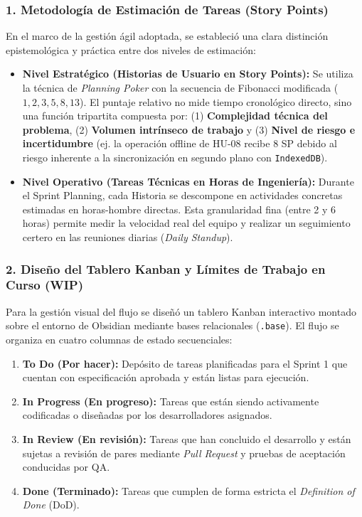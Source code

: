 \subsubsection*{\color{mauve} 1. Metodología de Estimación de Tareas (Story Points)}
\noindent En el marco de la gestión ágil adoptada, se estableció una clara distinción epistemológica y práctica entre dos niveles de estimación:
\begin{itemize}
    \item \textbf{Nivel Estratégico (Historias de Usuario en Story Points):} Se utiliza la técnica de \textit{Planning Poker} con la secuencia de Fibonacci modificada ($1, 2, 3, 5, 8, 13$). El puntaje relativo no mide tiempo cronológico directo, sino una función tripartita compuesta por: (1) \textbf{Complejidad técnica del problema}, (2) \textbf{Volumen intrínseco de trabajo} y (3) \textbf{Nivel de riesgo e incertidumbre} (ej. la operación offline de HU-08 recibe 8 SP debido al riesgo inherente a la sincronización en segundo plano con \texttt{IndexedDB}).
    \item \textbf{Nivel Operativo (Tareas Técnicas en Horas de Ingeniería):} Durante el Sprint Planning, cada Historia se descompone en actividades concretas estimadas en horas-hombre directas. Esta granularidad fina (entre 2 y 6 horas) permite medir la velocidad real del equipo y realizar un seguimiento certero en las reuniones diarias (\textit{Daily Standup}).
\end{itemize}

\subsubsection*{\color{mauve} 2. Diseño del Tablero Kanban y Límites de Trabajo en Curso (WIP)}
\noindent Para la gestión visual del flujo se diseñó un tablero Kanban interactivo montado sobre el entorno de Obsidian mediante bases relacionales (\texttt{.base}). El flujo se organiza en cuatro columnas de estado secuenciales:
\begin{enumerate}
    \item \textbf{To Do (Por hacer):} Depósito de tareas planificadas para el Sprint 1 que cuentan con especificación aprobada y están listas para ejecución.
    \item \textbf{In Progress (En progreso):} Tareas que están siendo activamente codificadas o diseñadas por los desarrolladores asignados.
    \item \textbf{In Review (En revisión):} Tareas que han concluido el desarrollo y están sujetas a revisión de pares mediante \textit{Pull Request} y pruebas de aceptación conducidas por QA.
    \item \textbf{Done (Terminado):} Tareas que cumplen de forma estricta el \textit{Definition of Done} (DoD).
\end{enumerate}

